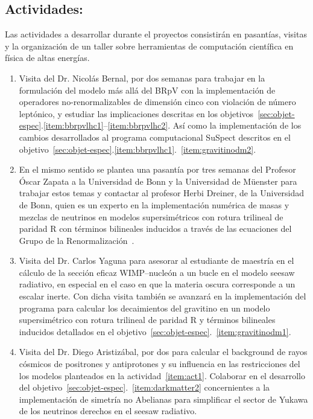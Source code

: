\subsection{Actividades:                                   }
\label{sec:actividades}
Las actividades a desarrollar durante el proyectos consistirán en
pasantías, visitas y la organización de un taller sobre herramientas de
computación científica en física de altas energías.

\begin{enumerate}
\item Visita del Dr. Nicolás Bernal, por dos semanas para trabajar en
  la formulación del modelo más allá del BRpV con la implementación de
  operadores no-renormalizables de dimensión cinco con violación de
  número leptónico, y estudiar las implicaciones descritas en los
  objetivos~\ref{sec:objet-espec}.\ref{item:bbrpvlhc1}--\ref{item:bbrpvlhc2}. Así
  como la implementación de los cambios desarrollados al programa
  computacional SuSpect descritos en el
  objetivo~\ref{sec:objet-espec}.\ref{item:bbrpvlhc1}.~\ref{item:gravitinodm2}. 
  \label{item:act1}

\item En el mismo sentido se plantea una pasantía por tres semanas del
  Profesor Óscar Zapata a la Universidad de Bonn y la Universidad de
  Müenster para trabajar estos temas y contactar al profesor Herbi
  Dreiner, de la Universidad de Bonn, quien es un experto en la
  implementación numérica de masas y mezclas de neutrinos en modelos
  supersimétricos con rotura trilineal de paridad R con términos
  bilineales inducidos a través de las ecuaciones del Grupo de la
  Renormalización~\cite{Dreiner:2011ft}.
  \label{item:act2}
\item Visita del Dr. Carlos Yaguna para asesorar al estudiante de
  maestría en el cálculo de la sección eficaz WIMP--nucleón a un bucle
  en el modelo seesaw radiativo, en especial en el caso en que la
  materia oscura corresponde a un escalar inerte. Con dicha visita
  también se avanzará en la implementación del programa para calcular
  los decaimientos del gravitino en un modelo supersimétrico con
  rotura trilineal de paridad R y términos bilineales inducidos
  detallados en el
  objetivo~\ref{sec:objet-espec}.~\ref{item:gravitinodm1}.
  \label{item:act3}

\item Visita del Dr. Diego Aristizábal, por dos para  calcular el
  background de rayos cósmicos de positrones y antiprotones y  su
  influencia en las restricciones del los modelos planteados en la
  actividad~\ref{item:act1}. Colaborar en el desarrollo del
  objetivo~\ref{sec:objet-espec}.~\ref{item:darkmatter2} concernientes
  a la implementación de simetría no Abelianas para simplificar el
  sector de Yukawa de los neutrinos derechos en el seesaw radiativo.
  \label{item:act4}


\end{enumerate}

